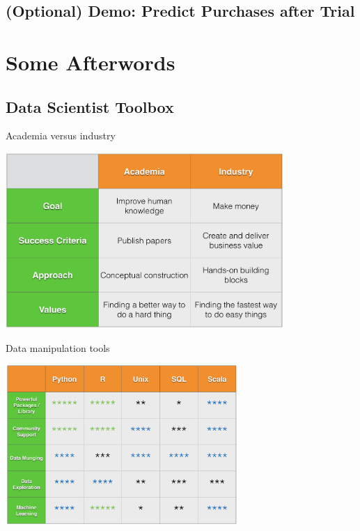 \documentclass[10pt]{beamer}
\begin{document}
    \subsection{(Optional) Demo: Predict Purchases after Trial}

\section{Some Afterwords}

  \subsection{Data Scientist Toolbox}

    \begin{frame}{Academia versus industry}
      \begin{center}
        \includegraphics[width=300pt]{graphs/academia_industry}
      \end{center}
    \end{frame}

    \begin{frame}{Data manipulation tools}
      \begin{center}
         \includegraphics[width=250pt]{graphs/data_tools}
      \end{center}
    \end{frame}
\end{document}

